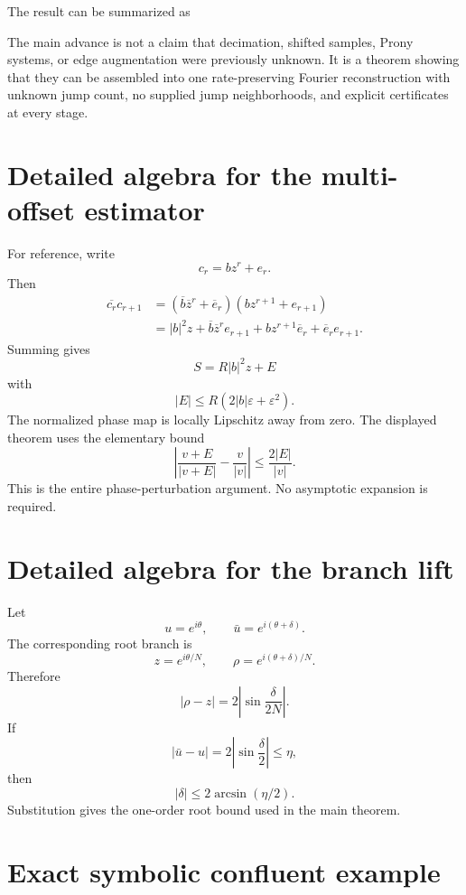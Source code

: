 \documentclass[11pt]{article}
\theoremstyle{remark}
\newcommand{\abs}[1]{\left|#1\right|}
\begin{document}
The result can be summarized as
\begin{center}
\end{center}

The main advance is not a claim that decimation, shifted samples, Prony systems, or edge augmentation were previously unknown. It is a theorem showing that they can be assembled into one rate-preserving Fourier reconstruction with unknown jump count, no supplied jump neighborhoods, and explicit certificates at every stage.

\appendix

\section{Detailed algebra for the multi-offset estimator}

For reference, write
\[
c_r=bz^r+e_r.
\]
Then
\[
\begin{aligned}
\overline{c_r}c_{r+1}
&=(\overline b\overline z^r+\overline e_r)(bz^{r+1}+e_{r+1})\\
&=\abs b^2z
+\overline b\overline z^r e_{r+1}
+bz^{r+1}\overline e_r
+\overline e_re_{r+1}.
\end{aligned}
\]
Summing gives
\[
S=R\abs b^2z+E
\]
with
\[
\abs E\le R(2\abs b\varepsilon+\varepsilon^2).
\]
The normalized phase map is locally Lipschitz away from zero. The displayed theorem uses the elementary bound
\[
\left|\frac{v+E}{\abs{v+E}}-\frac v{\abs v}\right|
\le
\frac{2\abs E}{\abs v}.
\]
This is the entire phase-perturbation argument. No asymptotic expansion is required.

\section{Detailed algebra for the branch lift}

Let
\[
u=e^{i\theta},
\qquad
\bar u=e^{i(\theta+\delta)}.
\]
The corresponding root branch is
\[
z=e^{i\theta/N},
\qquad
\rho=e^{i(\theta+\delta)/N}.
\]
Therefore
\[
\abs{\rho-z}
=2\left|\sin\frac{\delta}{2N}\right|.
\]
If
\[
\abs{\bar u-u}=2\left|\sin\frac\delta2\right|\le\eta,
\]
then
\[
\abs\delta\le2\arcsin(\eta/2).
\]
Substitution gives the one-order root bound used in the main theorem.

\section{Exact symbolic confluent example}
\end{document}
